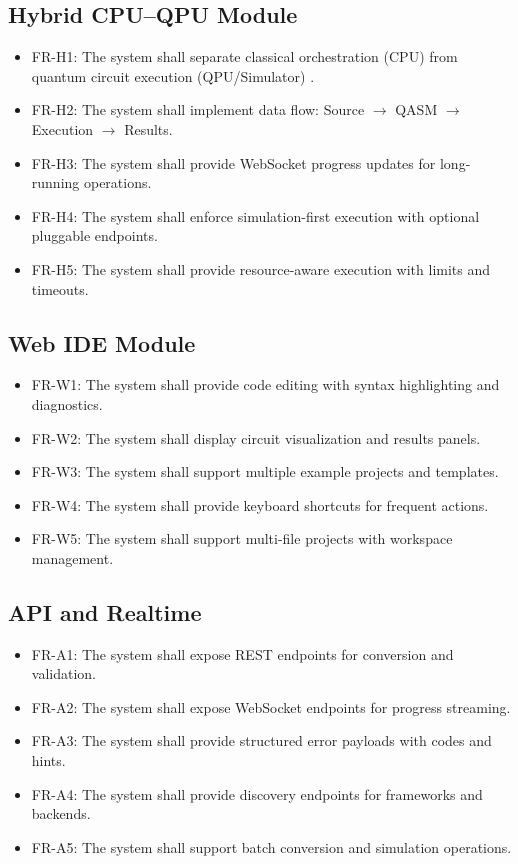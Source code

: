 \subsection{Hybrid CPU–QPU Module}
\begin{itemize}
    \item FR-H1: The system shall separate classical orchestration (CPU) from quantum circuit execution (QPU/Simulator) \cite{peruzzo2014variational}.
    \item FR-H2: The system shall implement data flow: Source $\rightarrow$ QASM $\rightarrow$ Execution $\rightarrow$ Results.
    \item FR-H3: The system shall provide WebSocket progress updates for long-running operations.
    \item FR-H4: The system shall enforce simulation-first execution with optional pluggable endpoints.
    \item FR-H5: The system shall provide resource-aware execution with limits and timeouts.
\end{itemize}

\subsection{Web IDE Module}
\begin{itemize}
    \item FR-W1: The system shall provide code editing with syntax highlighting and diagnostics.
    \item FR-W2: The system shall display circuit visualization and results panels.
    \item FR-W3: The system shall support multiple example projects and templates.
    \item FR-W4: The system shall provide keyboard shortcuts for frequent actions.
    \item FR-W5: The system shall support multi-file projects with workspace management.
\end{itemize}

\subsection{API and Realtime}
\begin{itemize}
    \item FR-A1: The system shall expose REST endpoints for conversion and validation.
    \item FR-A2: The system shall expose WebSocket endpoints for progress streaming.
    \item FR-A3: The system shall provide structured error payloads with codes and hints.
    \item FR-A4: The system shall provide discovery endpoints for frameworks and backends.
    \item FR-A5: The system shall support batch conversion and simulation operations.
\end{itemize}

